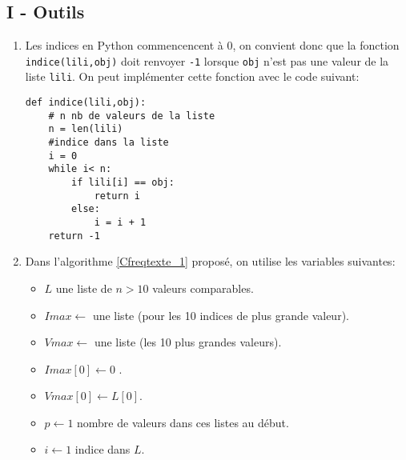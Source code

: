 \subsection*{I - Outils}
\begin{enumerate}
  \item Les indices en Python commencencent à $0$, on convient donc que la fonction \verb|indice(lili,obj)| doit renvoyer \verb|-1| lorsque \verb|obj| n'est pas une valeur de la liste \verb|lili|. On peut implémenter cette fonction avec le code suivant:
\begin{verbatim}
def indice(lili,obj):
    # n nb de valeurs de la liste
    n = len(lili)
    #indice dans la liste
    i = 0
    while i< n:
        if lili[i] == obj:
            return i
        else:
            i = i + 1
    return -1  
\end{verbatim}

  \item 
Dans l'algorithme \ref{Cfreqtexte_1} proposé, on utilise les variables suivantes:
\begin{itemize}
  \item $L$ une liste de $n>10$ valeurs comparables.
  \item $Imax\leftarrow$ une liste (pour les 10 indices de plus grande valeur).
  \item $Vmax\leftarrow$ une liste (les 10 plus grandes valeurs).
  \item $Imax[0]\leftarrow 0$ .
  \item $Vmax[0]\leftarrow L[0]$.
  \item $p\leftarrow 1$ nombre de valeurs dans ces listes au début.
  \item $i\leftarrow 1$ indice dans $L$.


\end{itemize}
\end{enumerate}
